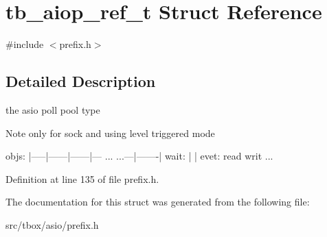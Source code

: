 \hypertarget{structtb__aiop__ref__t}{\section{tb\-\_\-aiop\-\_\-ref\-\_\-t Struct Reference}
\label{structtb__aiop__ref__t}
}


{\ttfamily \#include $<$prefix.\-h$>$}



\subsection{Detailed Description}
the asio poll pool type

\begin{DoxyNote}{Note}
only for sock and using level triggered mode
\end{DoxyNote}

\begin{DoxyPre}
objs: |-----|------|------|--- ... ...---|-------|
wait:    |            |
evet:   read         writ ...
\end{DoxyPre}
 

Definition at line 135 of file prefix.\-h.



The documentation for this struct was generated from the following file\-:\begin{DoxyCompactItemize}
\item 
src/tbox/asio/prefix.\-h\end{DoxyCompactItemize}
